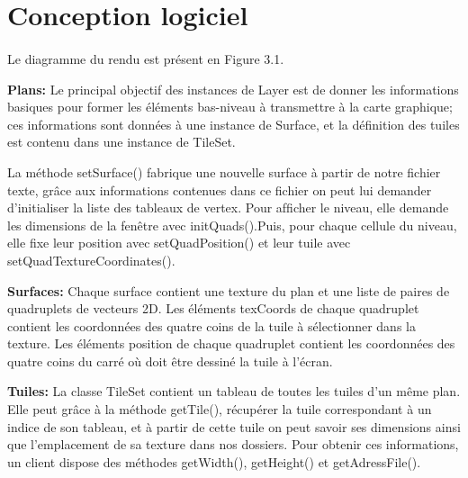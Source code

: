 \documentclass[12pt]{report}
\begin{document}
    
    \section{Conception logiciel}
    \paragraph{} Le diagramme du rendu est présent en Figure 3.1.
    
    \paragraphe{}\textbf{Plans:} Le principal objectif des instances de Layer est de donner les informations basiques pour former les éléments bas-niveau à transmettre à la carte graphique; ces informations sont données à une instance de Surface, et la déﬁnition des tuiles est contenu dans une instance de TileSet. 
    
    \paragraphe{}La méthode setSurface() fabrique une nouvelle surface à partir de notre fichier texte, grâce aux informations contenues dans ce fichier on peut lui demander d'initialiser la liste des tableaux de vertex. Pour afﬁcher le niveau, elle demande les dimensions de la fenêtre avec initQuads().Puis, pour chaque cellule du niveau, elle ﬁxe leur position avec setQuadPosition() et leur tuile avec setQuadTextureCoordinates(). 
    
    \paragraphe{}\textbf{Surfaces:} Chaque surface contient une texture du plan et une liste de paires de quadruplets de vecteurs 2D. Les éléments texCoords de chaque quadruplet contient les coordonnées des quatre coins de la tuile à sélectionner dans la texture. Les éléments position de chaque quadruplet contient les coordonnées des quatre coins du carré où doit être dessiné la tuile à l’écran. 
    
    \paragraphe{}\textbf{Tuiles:} La classe TileSet contient un tableau de toutes les tuiles d’un même plan. Elle peut grâce à la méthode getTile(), récupérer la tuile correspondant à un indice de son tableau, et à partir de cette tuile on peut savoir ses dimensions ainsi que l'emplacement de sa texture dans nos dossiers. Pour obtenir ces informations, un client dispose des méthodes getWidth(), getHeight() et getAdressFile(). 
\end{document}
